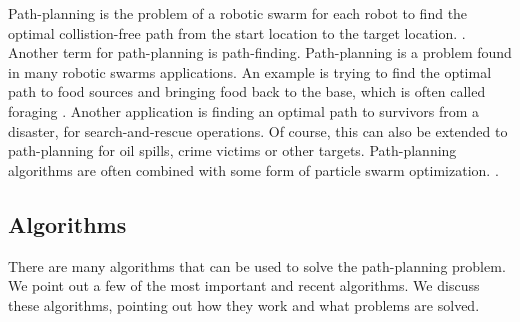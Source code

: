 
Path-planning is the problem of a robotic swarm for each robot to find the optimal collistion-free path from the start location to the target location. \cite{qin2004path}.
Another term for path-planning is path-finding. 
Path-planning is a problem found in many robotic swarms applications.
An example is trying to find the optimal path to food sources and bringing food back to the base, which is often called foraging \cite{hoff2010two}.
Another application is finding an optimal path to survivors from a disaster, for search-and-rescue operations.
Of course, this can also be extended to path-planning for oil spills, crime victims or other targets.\cite{pugh2007inspiring} 
Path-planning algorithms are often combined with some form of particle swarm optimization. \cite{poli2007particle}.

\subsection{Algorithms}
There are many algorithms that can be used to solve the path-planning problem. 
We point out a few of the most important and recent algorithms. \cite{hoff2010two} \cite{bhattacharjee2011multi} \cite{jung2010multi} \cite{kala2012multi}
We discuss these algorithms, pointing out how they work and what problems are solved.


